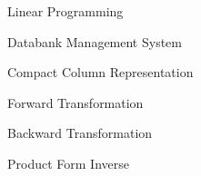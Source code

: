 {Linear Programming}

{Databank Management System}


{Compact Column Representation}

{Forward Transformation}

{Backward Transformation}

{Product Form Inverse}